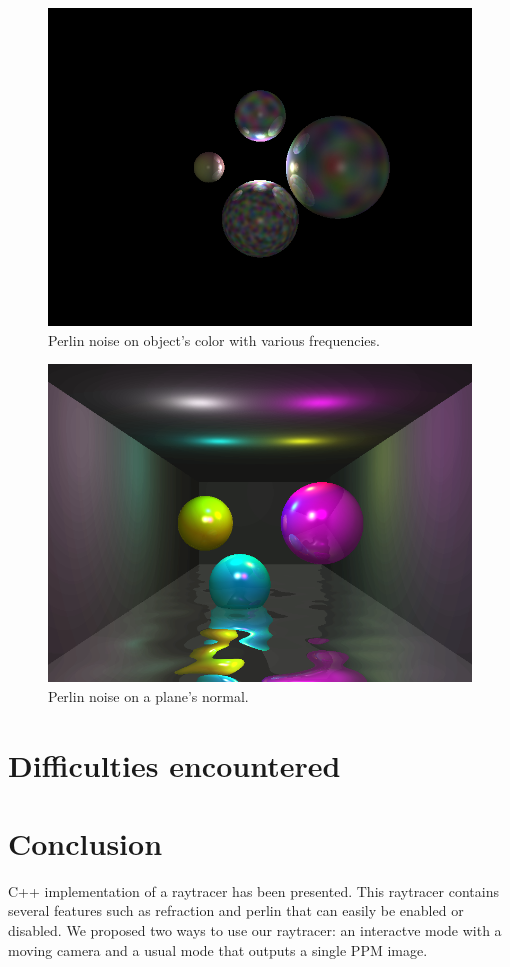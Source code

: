 \documentclass[a4paper,12pt,journal,twoside,compsoc]{PPIEEEtran}
\begin{document}
\begin{figure}
  \begin{center}
    \includegraphics[width=0.7\linewidth]{perlin-color.png}
  \end{center}
  \caption{Perlin noise on object's color with various frequencies.}
  \label{fig:perlin-color}
\end{figure}

\begin{figure}
  \begin{center}
    \includegraphics[width=0.7\linewidth]{perlin-normal.png}
  \end{center}
  \caption{Perlin noise on a plane's normal.}
  \label{fig:perlin-normal}
\end{figure}

\section{Difficulties encountered}

\section{Conclusion}
\label{concl}
 C++ implementation of a raytracer has been presented. This
raytracer contains several features such as refraction and perlin that can
easily be enabled or disabled. We proposed two ways to use our raytracer: an
interactve mode with a moving camera and a usual mode that outputs a single
PPM image.




\newpage
\onecolumn
\end{document}
